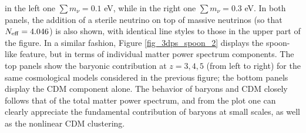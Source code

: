 \documentclass{emulateapj}
\begin{document}
in the left one   $\sum m_{\nu} =0.1$ eV, while  in the right  one   $\sum m_{\nu} =0.3$ eV.
In both panels, the addition of a sterile neutrino on top of massive neutrinos (so that $N_{\rm eff}=4.046$) 
is also shown, with identical line styles to those in the upper part of the figure. 
In a similar fashion, Figure \ref{fig_3dps_spoon_2} displays the spoon-like feature, but in terms of individual matter power spectrum components.
The top panels  show the baryonic contribution at $z=3,4,5$ (from left to right) for the same cosmological models considered in the previous figure; 
the bottom panels display the CDM component alone. The behavior of baryons and CDM closely follows that of the total matter power spectrum, 
and from the plot one can clearly appreciate the fundamental contribution of baryons at small scales, as well as the nonlinear CDM clustering.  
\end{document}
